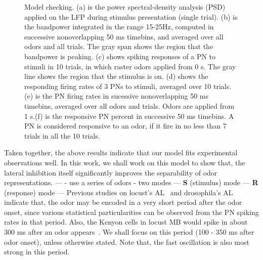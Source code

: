 \documentclass[12pt, a4paper]{article}
\begin{document}
\begin{figure}[htbp]
  \caption[Model]{\label{Figure0:model} \small Model checking. (a) is the power spectral-density analysis (PSD) applied on the LFP during stimulus presentation (single trial). (b) is the bandpower integrated in the range 15-25Hz, computed in successive nonoverlapping 50 ms timebins, and averaged over all odors and all trials. The gray span shows the region that the bandpower is peaking.
    (c) shows spiking responses of a PN to stimuli in 10 trials, in which raster odors applied from 0 s. The gray line shows the region that the stimulus is on. (d) shows the responding firing rates of 3 PNs to stimuli, averaged over 10 trials.
    (e) is the PN firing rates in sucessive nonoverlapping 50 ms timebins, averaged over all odors and trials. Odors are applied from 1 s.(f) is the responsive PN percent in successive 50 ms timebins. A PN is considered responsive to an odor, if it fire in no less than 7 trials in all the 10 trials. }
\end{figure}

Taken together, the above results indicate that our model fits experimental observations well. %
In this work, we shall work on this model to show that, the lateral inhibition itself significantly improves the separability of odor representations.
---
- use a series of odors
- two modes
--- {\bf S} (stimulus) mode
--- {\bf R} (response) mode
---
Previous studies on locust's AL~\citep{} and drosophila's AL~\citep{} indicate that, the odor may be encoded in a very short period after the odor onset, since various statistical particularities can be observed from the PN spiking rates in that period. Also, the Kenyon cells in locust MB would spike in about 300 ms after an odor appears~\citep{}. We shall focus on this period (100 - 350 ms after odor onset), unless otherwise stated. Note that, the fast oscillation is also most strong in this period.
\end{document}

